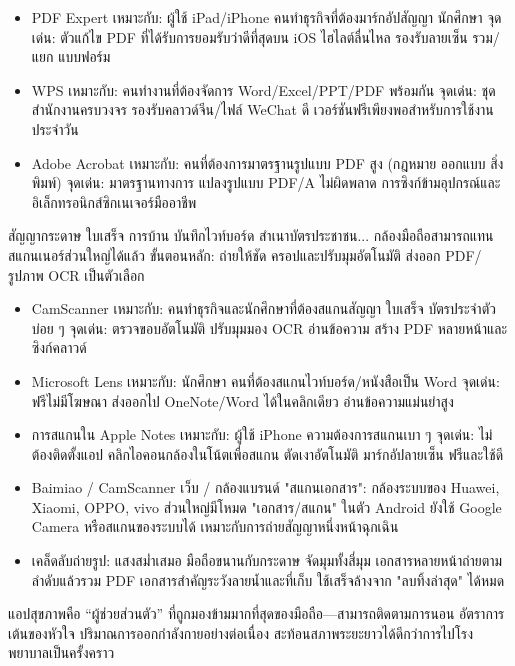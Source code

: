 
\begin{itemize}
  \item PDF Expert เหมาะกับ: ผู้ใช้ iPad/iPhone คนทำธุรกิจที่ต้องมาร์กอัปสัญญา นักศึกษา จุดเด่น: ตัวแก้ไข PDF ที่ได้รับการยอมรับว่าดีที่สุดบน iOS ไฮไลต์ลื่นไหล รองรับลายเซ็น รวม/แยก แบบฟอร์ม
  \item WPS เหมาะกับ: คนทำงานที่ต้องจัดการ Word/Excel/PPT/PDF พร้อมกัน จุดเด่น: ชุดสำนักงานครบวงจร รองรับคลาวด์จีน/ไฟล์ WeChat ดี เวอร์ชันฟรีเพียงพอสำหรับการใช้งานประจำวัน
  \item Adobe Acrobat เหมาะกับ: คนที่ต้องการมาตรฐานรูปแบบ PDF สูง (กฎหมาย ออกแบบ สิ่งพิมพ์) จุดเด่น: มาตรฐานทางการ แปลงรูปแบบ PDF/A ไม่ผิดพลาด การซิงก์ข้ามอุปกรณ์และอิเล็กทรอนิกส์ซิกเนเจอร์มืออาชีพ
\end{itemize}


สัญญากระดาษ ใบเสร็จ การบ้าน บันทึกไวท์บอร์ด สำเนาบัตรประชาชน... กล้องมือถือสามารถแทนสแกนเนอร์ส่วนใหญ่ได้แล้ว ขั้นตอนหลัก: ถ่ายให้ชัด ครอปและปรับมุมอัตโนมัติ ส่งออก PDF/รูปภาพ OCR เป็นตัวเลือก

\begin{itemize}
  \item CamScanner เหมาะกับ: คนทำธุรกิจและนักศึกษาที่ต้องสแกนสัญญา ใบเสร็จ บัตรประจำตัวบ่อย ๆ จุดเด่น: ตรวจขอบอัตโนมัติ ปรับมุมมอง OCR อ่านข้อความ สร้าง PDF หลายหน้าและซิงก์คลาวด์
  \item Microsoft Lens เหมาะกับ: นักศึกษา คนที่ต้องสแกนไวท์บอร์ด/หนังสือเป็น Word จุดเด่น: ฟรีไม่มีโฆษณา ส่งออกไป OneNote/Word ได้ในคลิกเดียว อ่านข้อความแม่นยำสูง
  \item การสแกนใน Apple Notes เหมาะกับ: ผู้ใช้ iPhone ความต้องการสแกนเบา ๆ จุดเด่น: ไม่ต้องติดตั้งแอป คลิกไอคอนกล้องในโน้ตเพื่อสแกน ตัดเงาอัตโนมัติ มาร์กอัปลายเซ็น ฟรีและใช้ดี
  \item Baimiao / CamScanner เว็บ / กล้องแบรนด์ "สแกนเอกสาร": กล้องระบบของ Huawei, Xiaomi, OPPO, vivo ส่วนใหญ่มีโหมด "เอกสาร/สแกน" ในตัว Android ยังใช้ Google Camera หรือสแกนของระบบได้ เหมาะกับการถ่ายสัญญาหนึ่งหน้าฉุกเฉิน
  \item เคล็ดลับถ่ายรูป: แสงสม่ำเสมอ มือถือขนานกับกระดาษ จัดมุมทั้งสี่มุม เอกสารหลายหน้าถ่ายตามลำดับแล้วรวม PDF เอกสารสำคัญระวังลายน้ำและที่เก็บ ใช้เสร็จล้างจาก "ลบทิ้งล่าสุด" ได้หมด
\end{itemize}


แอปสุขภาพคือ “ผู้ช่วยส่วนตัว” ที่ถูกมองข้ามมากที่สุดของมือถือ—สามารถติดตามการนอน อัตราการเต้นของหัวใจ ปริมาณการออกกำลังกายอย่างต่อเนื่อง สะท้อนสภาพระยะยาวได้ดีกว่าการไปโรงพยาบาลเป็นครั้งคราว

